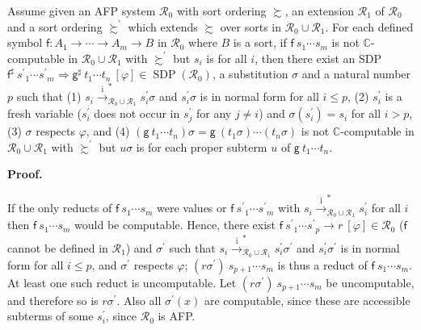 \documentclass[10pt,a4paper]{amsart}
\begin{document}
Assume given an AFP system $\mathcal{R}_{0}$ with sort ordering $\succsim$, an extension $\mathcal{R}_{1}$ of $\mathcal{R}_{0}$ and a sort ordering $\succsim^{\prime}$ which extends $\succsim$ over sorts in $\mathcal{R}_{0}\cup\mathcal{R}_{1}$. For each defined symbol $\mathsf{f}:{A}_{1}\rightarrow\cdots\rightarrow{A}_{m}\rightarrow B$ in $\mathcal{R}_{0}$ where $B$ is a sort, if ${\mathsf{f}}\ {{s}_{1}\cdots{s}_{m}}$ is not $\mathbb{C}$-computable in $\mathcal{R}_{0}\cup\mathcal{R}_{1}$ with $\succsim^{\prime}$ but $s_{i}$ is for all $i$, then there exist an SDP ${{\mathsf{f}^{\sharp}}\ {{s^{\prime}}_{1}\cdots{s^{\prime}}_{m}}}\Rightarrow{{\mathsf{g}^{\sharp}}\ {{t}_{1}\cdots{t}_{n}}}\ [\varphi]\in\operatorname{SDP}(\mathcal{R}_{0})$, a substitution $\sigma$ and a natural number $p$ such that (1) $s_{i}\xrightarrow{\scriptscriptstyle\mathrm{i}}_{\mathcal{R}_{0}\cup\mathcal{R}_{1}}^{*}s_{i}^{\prime}\sigma$ and $s_{i}^{\prime}\sigma$ is in normal form for all $i\leq p$, (2) $s_{i}^{\prime}$ is a fresh variable ($s_{i}^{\prime}$ does not occur in $s_{j}^{\prime}$ for any $j\neq i$) and $\sigma(s_{i}^{\prime})=s_{i}$ for all $i>p$, (3) $\sigma$ respects $\varphi$, and (4) $({\mathsf{g}}\ {{t}_{1}\cdots{t}_{n}})\sigma={\mathsf{g}}\ {(t_{1}\sigma)\cdots(t_{n}\sigma)}$ is not $\mathbb{C}$-computable in $\mathcal{R}_{0}\cup\mathcal{R}_{1}$ with $\succsim^{\prime}$ but $u\sigma$ is for each proper subterm $u$ of ${\mathsf{g}}\ {{t}_{1}\cdots{t}_{n}}$.\par
 
 
 
 
\par\medskip\noindent\textbf{Proof.}\par
 
 
If the only reducts of ${\mathsf{f}}\ {{s}_{1}\cdots{s}_{m}}$ were values or ${\mathsf{f}}\ {{s^{\prime}}_{1}\cdots{s^{\prime}}_{m}}$ with $s_{i}\xrightarrow{\scriptscriptstyle\mathrm{i}}_{\mathcal{R}_{0}\cup\mathcal{R}_{1}}^{*}s_{i}^{\prime}$ for all $i$ then ${\mathsf{f}}\ {{s}_{1}\cdots{s}_{m}}$ would be computable. Hence, there exist ${{\mathsf{f}}\ {{s^{\prime}}_{1}\cdots{s^{\prime}}_{p}}}\rightarrow{r}\ [\varphi]\in\mathcal{R}_{0}$ ($\mathsf{f}$ cannot be defined in $\mathcal{R}_{1}$) and $\sigma^{\prime}$ such that $s_{i}\xrightarrow{\scriptscriptstyle\mathrm{i}}_{\mathcal{R}_{0}\cup\mathcal{R}_{1}}^{*}s_{i}^{\prime}\sigma^{\prime}$ and $s_{i}^{\prime}\sigma^{\prime}$ is in normal form for all $i\leq p$, and $\sigma^{\prime}$ respects $\varphi$; ${(r\sigma^{\prime})}\ {{s}_{p+1}\cdots{s}_{m}}$ is thus a reduct of ${\mathsf{f}}\ {{s}_{1}\cdots{s}_{m}}$. At least one such reduct is uncomputable. Let ${(r\sigma^{\prime})}\ {{s}_{p+1}\cdots{s}_{m}}$ be uncomputable, and therefore so is $r\sigma^{\prime}$. Also all $\sigma^{\prime}(x)$ are computable, since these are accessible subterms of some $s_{i}^{\prime}$, since $\mathcal{R}_{0}$ is AFP.\par
 
\end{document}
